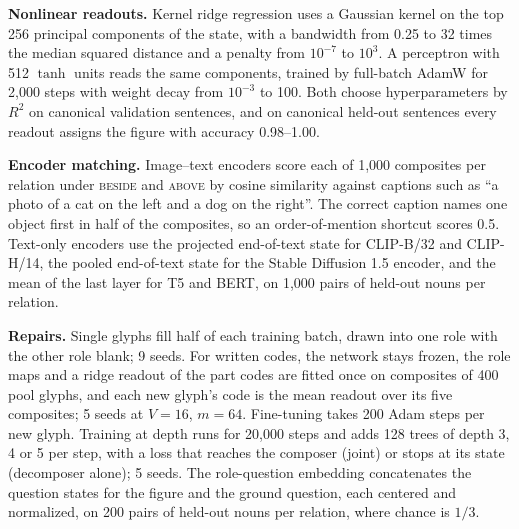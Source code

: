\textbf{Nonlinear readouts.}\label{app:e19} Kernel ridge regression uses a Gaussian kernel on the top 256 principal components of the state, with a bandwidth from 0.25 to 32 times the median squared distance and a penalty from $10^{-7}$ to $10^{3}$. A perceptron with 512 $\tanh$ units reads the same components, trained by full-batch AdamW for 2{,}000 steps with weight decay from $10^{-3}$ to 100. Both choose hyperparameters by $R^2$ on canonical validation sentences, and on canonical held-out sentences every readout assigns the figure with accuracy 0.98--1.00.

\textbf{Encoder matching.} Image--text encoders score each of 1{,}000 composites per relation under \textsc{beside} and \textsc{above} by cosine similarity against captions such as ``a photo of a cat on the left and a dog on the right''. The correct caption names one object first in half of the composites, so an order-of-mention shortcut scores 0.5. Text-only encoders use the projected end-of-text state for CLIP-B/32 and CLIP-H/14, the pooled end-of-text state for the Stable Diffusion 1.5 encoder, and the mean of the last layer for T5 and BERT, on 1{,}000 pairs of held-out nouns per relation.

\textbf{Repairs.} Single glyphs fill half of each training batch, drawn into one role with the other role blank; 9 seeds. For written codes, the network stays frozen, the role maps and a ridge readout of the part codes are fitted once on composites of 400 pool glyphs, and each new glyph's code is the mean readout over its five composites; 5 seeds at $V = 16$, $m = 64$. Fine-tuning takes 200 Adam steps per new glyph. Training at depth runs for 20{,}000 steps and adds 128 trees of depth 3, 4 or 5 per step, with a loss that reaches the composer (joint) or stops at its state (decomposer alone); 5 seeds. The role-question embedding concatenates the question states for the figure and the ground question, each centered and normalized, on 200 pairs of held-out nouns per relation, where chance is $1/3$.


